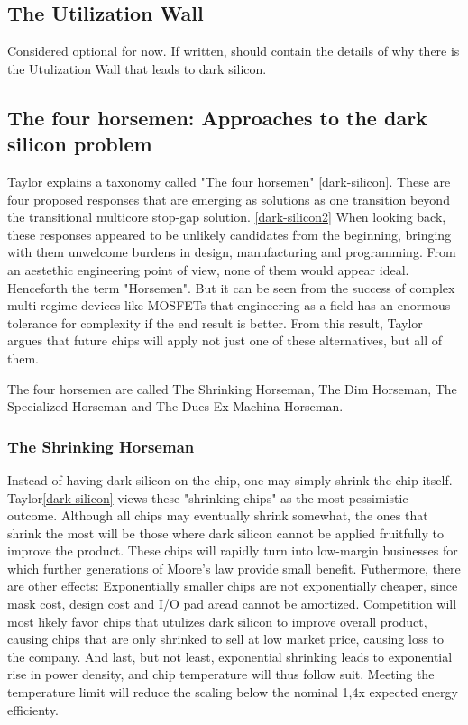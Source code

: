 \subsection{The Utilization Wall}
Considered optional for now.
If written, should contain the details of why there is the Utulization Wall that leads to dark silicon. 

\subsection{The four horsemen: Approaches to the dark silicon problem}
Taylor explains a taxonomy called "The four horsemen" \ref{dark-silicon}.
These are four proposed responses that are emerging as solutions as one transition beyond the transitional multicore stop-gap solution. \ref{dark-silicon2}
When looking back, these responses appeared to be unlikely candidates from the beginning, bringing with them unwelcome burdens in design, manufacturing and programming.
From an aestethic engineering point of view, none of them would appear ideal.
Henceforth the term "Horsemen".
But it can be seen from the success of complex multi-regime devices like MOSFETs that engineering as a field has an enormous tolerance for complexity if the end result is better.
From this result, Taylor argues that future chips will apply not just one of these alternatives, but all of them.

The four horsemen are called The Shrinking Horseman, The Dim Horseman, The Specialized Horseman and The Dues Ex Machina Horseman.

\subsubsection{The Shrinking Horseman}
Instead of having dark silicon on the chip, one may simply shrink the chip itself.
Taylor\ref{dark-silicon} views these "shrinking chips" as the most pessimistic outcome.
Although all chips may eventually shrink somewhat, the ones that shrink the most will be those where dark silicon cannot be applied fruitfully to improve the product.
These chips will rapidly turn into low-margin businesses for which further generations of Moore’s law provide small benefit.
Futhermore, there are other effects: Exponentially smaller chips are not exponentially cheaper, since mask cost, design cost and I/O pad aread cannot be amortized. 
Competition will most likely favor chips that utulizes dark silicon to improve overall product, causing chips that are only shrinked to sell at low market price, causing loss to the company.
And last, but not least, exponential shrinking leads to exponential rise in power density, and chip temperature will thus follow suit.
Meeting the temperature limit will reduce the scaling below the nominal 1,4x expected energy efficienty. 


